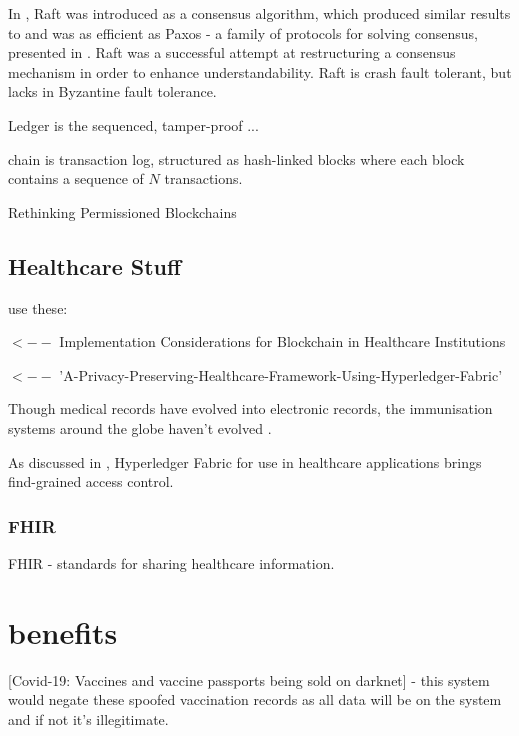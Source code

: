 In \cite{ongaro_search_2014}, Raft was introduced as a consensus algorithm, which produced similar results to and was as efficient as Paxos - a family of protocols for solving consensus, presented in \cite{pease_reaching_1980}.
Raft was a successful attempt at restructuring a consensus mechanism in order to enhance understandability. Raft is crash fault tolerant, but lacks in Byzantine fault tolerance. \cite{ongaro_search_2014} 


Ledger is the sequenced, tamper-proof ... 

chain is transaction log, structured as hash-linked blocks where each block contains a sequence of $N$ transactions.

Rethinking Permissioned Blockchains \cite{vukolic_rethinking_2017} 

\subsection{Healthcare Stuff} %


use these: 

\cite{paranjape_implementation_2019} $ <-- $ Implementation Considerations for Blockchain in Healthcare Institutions



\cite{stamatellis_privacy-preserving_2020} $<--$ 'A-Privacy-Preserving-Healthcare-Framework-Using-Hyperledger-Fabric'

Though medical records have evolved into electronic records, the immunisation systems around the globe haven't evolved \cite{abbas_review_2014}.

As discussed in \cite{yu_comparison_2020}, Hyperledger Fabric for use in healthcare applications brings find-grained access control. %
 
\subsubsection{FHIR}
FHIR - standards for sharing healthcare information.\linebreak[1]


\section{benefits}
[Covid-19: Vaccines and vaccine passports being sold on darknet] - this system would negate these spoofed vaccination records as all data will be on the system and if not it's illegitimate.
\linebreak[3]

